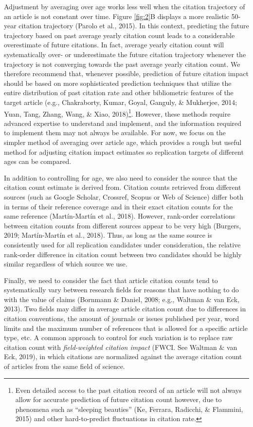 \documentclass[
  english,
  jou,floatsintext]{apa6}
\begin{document}
Adjustment by averaging over age works less well when the citation trajectory of an article is not constant over time. Figure \ref{fig:2}B displays a more realistic 50-year citation trajectory (Parolo et al., 2015). In this context, predicting the future trajectory based on past average yearly citation count leads to a considerable overestimate of future citations. In fact, average yearly citation count will systematically over- or underestimate the future citation trajectory whenever the trajectory is not converging towards the past average yearly citation count. We therefore recommend that, whenever possible, prediction of future citation impact should be based on more sophisticated prediction techniques that utilize the entire distribution of past citation rate and other bibliometric features of the target article (e.g., Chakraborty, Kumar, Goyal, Ganguly, \& Mukherjee, 2014; Yuan, Tang, Zhang, Wang, \& Xiao, 2018)\footnote{Even detailed access to the past citation record of an article will not always allow for accurate prediction of future citation count however, due to phenomena such as ``sleeping beauties'' (Ke, Ferrara, Radicchi, \& Flammini, 2015) and other hard-to-predict fluctuations in citation rate.}. However, these methods require advanced expertise to understand and implement, and the information required to implement them may not always be available. For now, we focus on the simpler method of averaging over article age, which provides a rough but useful method for adjusting citation impact estimates so replication targets of different ages can be compared.

In addition to controlling for age, we also need to consider the source that the citation count estimate is derived from. Citation counts retrieved from different sources (such as Google Scholar, Crossref, Scopus or Web of Science) differ both in terms of their reference coverage and in their exact citation counts for the same reference (Martín-Martín et al., 2018). However, rank-order correlations between citation counts from different sources appear to be very high (Burgers, 2019; Martín-Martín et al., 2018). Thus, as long as the same source is consistently used for all replication candidates under consideration, the relative rank-order difference in citation count between two candidates should be highly similar regardless of which source we use.

Finally, we need to consider the fact that article citation counts tend to systematically vary between research fields for reasons that have nothing to do with the value of claims (Bornmann \& Daniel, 2008; e.g., Waltman \& van Eck, 2013). Two fields may differ in average article citation count due to differences in citation conventions, the amount of journals or issues published per year, word limits and the maximum number of references that is allowed for a specific article type, etc. A common approach to control for such variation is to replace raw citation count with \emph{field-weighted citation impact} (FWCI. See Waltman \& van Eck, 2019), in which citations are normalized against the average citation count of articles from the same field of science.
\end{document}
